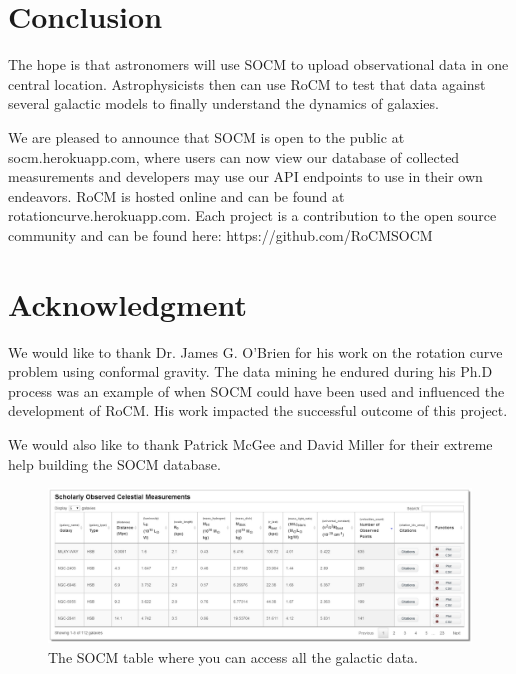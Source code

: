 \documentclass[conference]{IEEEtran}
\begin{document}
\section{Conclusion}
The hope is that astronomers will use SOCM to upload observational data in one central location. Astrophysicists then can use RoCM to test that data against several galactic models to finally understand the dynamics of galaxies. 

	 We are pleased to announce that SOCM is open to the public at socm.herokuapp.com, where users can now view our database of collected measurements and developers may use our API endpoints to use in their own endeavors. RoCM is hosted online and can be found at rotationcurve.herokuapp.com. Each project is a contribution to the open source community and can be found here: https://github.com/RoCMSOCM



\section*{Acknowledgment}

We would like to thank Dr. James G. O’Brien for his work on the rotation curve problem using conformal gravity. The data mining he endured during his Ph.D process was an example of when SOCM could have been used and influenced the development of RoCM. His work impacted the successful outcome of this project. 

We would also like to thank Patrick McGee and David Miller for their extreme help building the SOCM database.







\begin{figure}[!t]
\centering
\includegraphics[width=\textwidth]{socmtable2}
\caption{The SOCM table where you can access all the galactic data.}
\label{socm_fig}
\end{figure}
\end{document}
